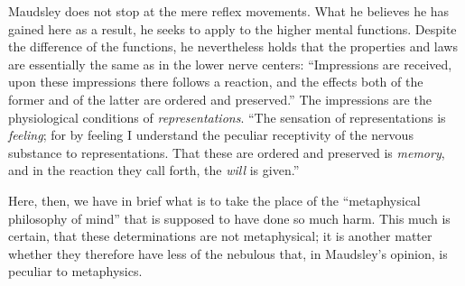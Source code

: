 \documentclass[12pt,a4paper,openany]{book}
\newcommand{\opage}[1]{\marginnote{\footnotesize\textit{[#1]}}}
\begin{document}
\opage{317}Maudsley does not stop at the mere reflex movements.
What he believes he has gained here as a result,
he seeks to apply to the higher mental functions.
Despite the difference of the functions, he nevertheless holds that the properties
and laws are essentially the same as in the lower
nerve centers: ``Impressions are received, upon these impressions there follows
a reaction, and the effects both of the former and of
the latter are ordered and preserved.'' The impressions are the physiological
conditions of \emph{representations}. ``The sensation of representations
is \emph{feeling}; for by feeling I understand
the peculiar receptivity of the nervous substance to representations.
That these are ordered and preserved is \emph{memory}, and in the
reaction they call forth, the \emph{will} is given.''

Here, then, we have in brief what is to take the
place of the ``metaphysical philosophy of mind'' that is supposed to
have done so much harm. This much is certain, that these
determinations are not metaphysical; it is another matter whether
they therefore have less of the nebulous that, in Maudsley's
opinion, is peculiar to metaphysics.
\end{document}
